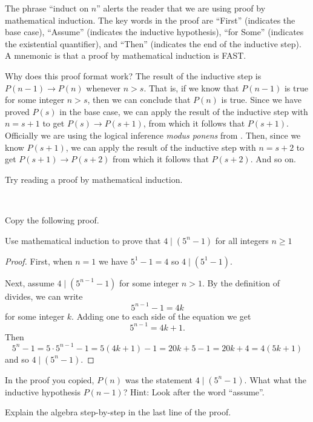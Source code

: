 The phrase ``induct on $n$'' alerts the reader that we are using proof by mathematical induction. The key words in the proof are ``First'' (indicates the base case), ``Assume'' (indicates the inductive hypothesis), ``for Some'' (indicates the existential quantifier), and ``Then'' (indicates the end of the inductive step).  A mnemonic is that a proof by mathematical induction is FAST.

Why does this proof format work? The result of the inductive step is $P(n-1) \to P(n)$ whenever $n > s$.  That is, if we know that $P(n-1)$ is true for some integer $n >s$, then we can conclude that $P(n)$ is true. Since we have proved $P(s)$ in the base case, we can apply the result of the inductive step with $n=s+1$ to get $P(s) \to P(s+1)$, from which it follows that $P(s+1)$.  Officially we are using the logical inference \emph{modus ponens} from . Then, since we know $P(s+1)$, we can apply the result of the inductive step with $n=s+2$ to get $P(s+1) \to P(s+2)$ from which it follows that $P(s+2)$. And so on.

Try reading a proof by mathematical induction.

\begin{act}
\label{act_div_proof_math_ind}
~
    \begin{actpart}
        \item Copy the following proof.

        Use mathematical induction to prove that $4 \mid (5^n-1)$ for all integers $n \ge 1$
            \begin{proof}
                First, when $n=1$ we have $5^1-1=4$ so $4 \mid (5^1-1)$.

                Next, assume $4 \mid (5^{n-1}-1)$ for some integer $n > 1$.  By the definition of divides, we can write $$5^{n-1}-1=4k$$ for some integer $k$. Adding one to each side of the equation we get $$5^{n-1}=4k+1.$$
                Then $$5^n-1=5\cdot5^{n-1}-1 = 5(4k+1)-1 = 20k + 5 -1= 20k+4 = 4(5k+1)$$
                and so $4 \mid (5^n-1).$
            \end{proof}
        \item In the proof you copied, $P(n)$ was the statement $4 \mid (5^n-1)$.  What what the inductive hypothesis $P(n-1)$?  Hint: Look after the word ``assume''.
        \item Explain the algebra step-by-step in the last line of the proof.
    \end{actpart}
\end{act}

